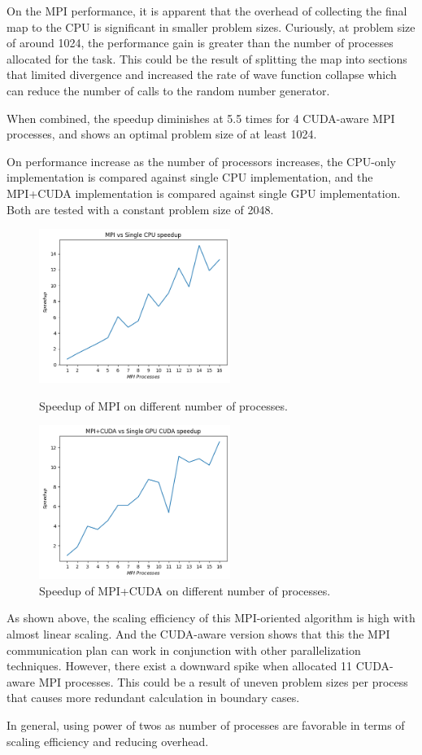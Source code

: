 On the MPI performance, it is apparent that the overhead of collecting the final map to the CPU is significant in smaller problem sizes. Curiously, at problem size of around 1024, the performance gain is greater than the number of processes allocated for the task. This could be the result of splitting the map into sections that limited divergence and increased the rate of wave function collapse which can reduce the number of calls to the random number generator.

When combined, the speedup diminishes at 5.5 times for 4 CUDA-aware MPI processes, and shows an optimal problem size of at least 1024. 

On performance increase as the number of processors increases, the CPU-only implementation is compared against single CPU implementation, and the MPI+CUDA implementation is compared against single GPU implementation. Both are tested with a constant problem size of 2048. 

\begin{figure}[!htb]
    \centering
    \includegraphics[height=5cm]{images/MPI_speedup_more_processes.png}
    \caption{Speedup of MPI on different number of processes.}
    \endminipage\hfill
    \centering
    \includegraphics[height=5cm]{images/MPI_CUDA_speedup_more_processes.png}
    \caption{Speedup of MPI+CUDA on different number of processes.}
    \endminipage\hfill
    
\end{figure}

As shown above, the scaling efficiency of this MPI-oriented algorithm is high with almost linear scaling. And the CUDA-aware version shows that this the MPI communication plan can work in conjunction with other parallelization techniques. However, there exist a downward spike when allocated 11 CUDA-aware MPI processes. This could be a result of uneven problem sizes per process that causes more redundant calculation in boundary cases. 

In general, using power of twos as number of processes are favorable in terms of scaling efficiency and reducing overhead.